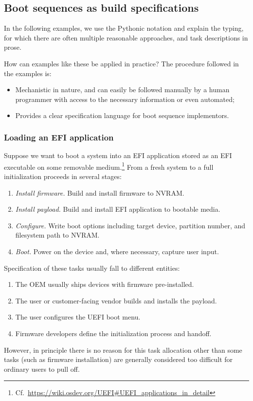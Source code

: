 \subsection{Boot sequences as build specifications}

In the following examples, we use the Pythonic notation and explain the typing, for which there are often multiple reasonable approaches, and task descriptions in prose.

How can examples like these be applied in practice?
%
The procedure followed in the examples is:
\begin{itemize}
  \item Mechanistic in nature, and can easily be followed manually by a human programmer with access to the necessary information or even automated;
  \item Provides a clear specification language for boot sequence implementors.
\end{itemize}

\subsubsection{Loading an EFI application} \label{efi-boot}

Suppose we want to boot a system into an EFI application stored as an EFI executable on some removable medium.\footnote{Cf.~\url{https://wiki.osdev.org/UEFI\#UEFI\_applications\_in\_detail}}
%
From a fresh system to a full initialization proceeds in several stages:
%
\begin{enumerate}
  \item \emph{Install firmware.} Build and install firmware to NVRAM.
  \item \emph{Install payload.} Build and install EFI application to bootable media.
  \item \emph{Configure.} Write boot options including target device, partition number, and filesystem path to NVRAM.
  \item \emph{Boot.} Power on the device and, where necessary, capture user input.
\end{enumerate}
%
Specification of these tasks usually fall to different entities:
%
\begin{enumerate}
  \item The OEM usually ships devices with firmware pre-installed.
  \item The user or customer-facing vendor builds and installs the payload.
  \item The user configures the UEFI boot menu.
  \item Firmware developers define the initialization process and handoff.
\end{enumerate}
%
However, in principle there is no reason for this task allocation other than some tasks (such as firmware installation) are generally considered too difficult for ordinary users to pull off.

